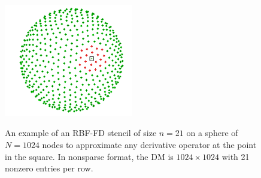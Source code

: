 \begin{figure}%
\centering
\includegraphics[width=0.5\textwidth]{figures/RBFStencil}\label{fig:stencil}
\caption{An example of an RBF-FD stencil of size $n=21$ on a sphere of $N=1024$ nodes to approximate any derivative operator at the point in the square. In nonsparse format, the DM  is $1024\times1024$ with 21 nonzero entries per row.}
\end{figure}

